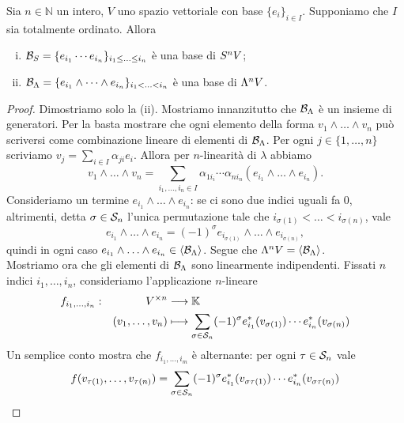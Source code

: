 \begin{proposition}
Sia $n\in\mathbb{N}$ un intero, $V$ uno spazio vettoriale con base $\{e_i\}_{i\in I}$. Supponiamo che $I$ sia totalmente ordinato. Allora
\begin{enumerate}[(i)]
\item $\mathcal{B}_S=\{e_{i_1}\cdots e_{i_n}\}_{i_1\le\ldots\le i_n}$ è una base di $S^nV$;
\item $\mathcal{B}_\Lambda=\{e_{i_1}\wedge\cdots\wedge e_{i_n}\}_{i_1<\ldots<i_n}$ è una base di $\Lambda^nV$.
\end{enumerate}
\end{proposition}
\begin{proof}
Dimostriamo solo la (ii). Mostriamo innanzitutto che $\mathcal{B}_\Lambda$ è un insieme di generatori. Per la  basta mostrare che ogni elemento della forma $v_1\wedge\ldots\wedge v_n$ può scriversi come combinazione lineare di elementi di $\mathcal{B}_\Lambda$. Per ogni $j\in\{1,\ldots,n\}$ scriviamo $v_j=\sum_{i\in I}\alpha_{ji}e_i$. Allora per $n$-linearità di $\lambda$ abbiamo
$$
v_1\wedge\ldots\wedge v_n=\sum_{i_1,\ldots,i_n\in I}\alpha_{1i_i}\cdots\alpha_{ni_n}(e_{i_1}\wedge\ldots\wedge e_{i_n}).
$$
Consideriamo un termine $e_{i_1}\wedge\ldots\wedge e_{i_n}$: se ci sono due indici uguali fa 0, altrimenti, detta $\sigma\in\mathcal{S}_n$ l'unica permutazione tale che $i_{\sigma(1)}<\ldots<i_{\sigma(n)}$, vale 
$$
e_{i_1}\wedge\ldots\wedge e_{i_n}=(-1)^\sigma e_{i_{\sigma(1)}}\wedge\ldots\wedge e_{i_{\sigma(n)}},
$$
quindi in ogni caso $e_{i_1}\wedge\ldots\wedge e_{i_n}\in\langle\mathcal{B}_\Lambda\rangle$. Segue che $\Lambda^nV=\langle\mathcal{B}_\Lambda\rangle$.\\
Mostriamo ora che gli elementi di $\mathcal{B}_\Lambda$ sono linearmente indipendenti. Fissati $n$ indici $i_1,\ldots,i_n$, consideriamo l'applicazione $n$-lineare
\begin{alignat*}{2}
f_{i_1,\ldots,i_n}:&&V^{\times n}&\longrightarrow\mathbb{K}\\
&&(v_1,\ldots,v_n)&\longmapsto\sum_{\sigma\in\mathcal{S}_n}(-1)^\sigma e_{i_1}^*(v_{\sigma(1)})\cdots e_{i_n}^*(v_{\sigma(n)})
\end{alignat*}
Un semplice conto mostra che $f_{i_1,\ldots,i_m}$ è alternante: per ogni $\tau\in\mathcal{S}_n$ vale
\begin{align*}
f(v_{\tau(1)},\ldots,v_{\tau(n)})&=\sum_{\sigma\in\Sym_n}(-1)^\sigma e_{i_1}^*(v_{\sigma\tau(1)})\cdots e_{i_n}^*(v_{\sigma\tau(n)})\\

\end{align*}
\end{proof}
